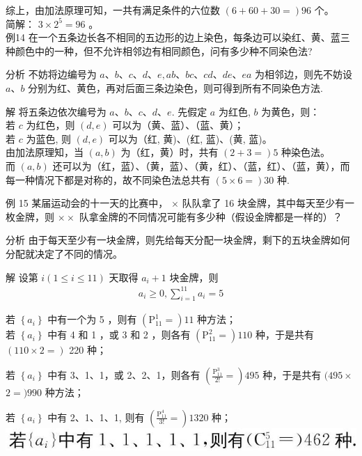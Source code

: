 \documentclass[10pt]{article}
\begin{document}
综上，由加法原理可知，一共有满足条件的六位数 $(6+60+30=) 96$ 个。\\
简解： $3 \times 2^{5}=96$ 。\\
例14 在一个五条边长各不相同的五边形的边上染色，每条边可以染红、黄、蓝三种颜色中的一种，但不允许相邻边有相同颜色，问有多少种不同染色法?

分析 不妨将边编号为 $a 、 b 、 c 、 d 、 e, a b 、 b c 、 c d 、 d e 、 e a$ 为相邻边，则先不妨设 $a 、 b$ 分别为红、黄色，再对后面三条边染色，则可得到所有不同染色方法.

解 将五条边依次编号为 $a 、 b 、 c 、 d 、 e$. 先假定 $a$ 为红色, $b$ 为黄色，则：\\
若 $c$ 为红色，则 $(d, e)$ 可以为（黄、蓝）、（蓝、黄）；\\
若 $c$ 为蓝色, 则 $(d, e)$ 可以为（红, 黄)、(红, 蓝)、(黄, 蓝)。\\
由加法原理知，当 $(a, b)$ 为（红，黄）时，共有 $(2+3=) 5$ 种染色法。\\
而 $(a, b)$ 还可以为（红，蓝）、（黄，蓝）、（黄，红）、（蓝，红）、（蓝，黄），而每一种情况下都是对称的，故不同染色法总共有 $(5 \times 6=) 30$ 种.

例 15 某届运动会的十一天的比赛中， $\times$ 队队拿了 16 块金牌，其中每天至少有一枚金牌，则 $\times \times$ 队拿金牌的不同情况可能有多少种（假设金牌都是一样的）？

分析 由于每天至少有一块金牌，则先给每天分配一块金牌，剩下的五块金牌如何分配就决定了不同的情况。

解 设第 $i(1 \leqslant i \leqslant 11)$ 天取得 $a_{i}+1$ 块金牌，则\\
\begin{align*}
a_{i} \geqslant 0, \sum_{i=1}^{11} a_{i}=5
\end{align*}

若 $\left\{a_{i}\right\}$ 中有一个为 5 ，则有 $\left(\mathrm{P}_{11}^{1}=\right) 11$ 种方法；\\
若 $\left\{a_{i}\right\}$ 中有 4 和 1 ，或 3 和 2 ，则各有 $\left(\mathrm{P}_{11}^{2}=\right) 110$ 种，于是共有 $(110 \times 2=)$ 220 种；

若 $\left\{a_{i}\right\}$ 中有 3、1、1，或 2、2、1，则各有 $\left(\frac{\mathrm{P}_{11}^{3}}{2!}=\right) 495$ 种，于是共有 $(495 \times$ $2=) 990$ 种方法；

若 $\left\{a_{i}\right\}$ 中有 2、1、1、1, 则有 $\left(\frac{\mathrm{P}_{11}^{4}}{3!}=\right) 1320$ 种；\\
\includegraphics[max width=\textwidth, center]{2024_10_09_bce9f07034ef55fc9c97g-13}
\end{document}
